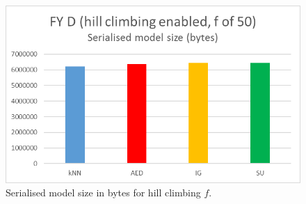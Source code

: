 \begin{figure}[hp]
\includegraphics[scale=0.17]{Graphs/FY_D/H_bytes}
\caption{Serialised model size in bytes for hill climbing $f$.}
\label{fig:bytes_h}
\end{figure}


